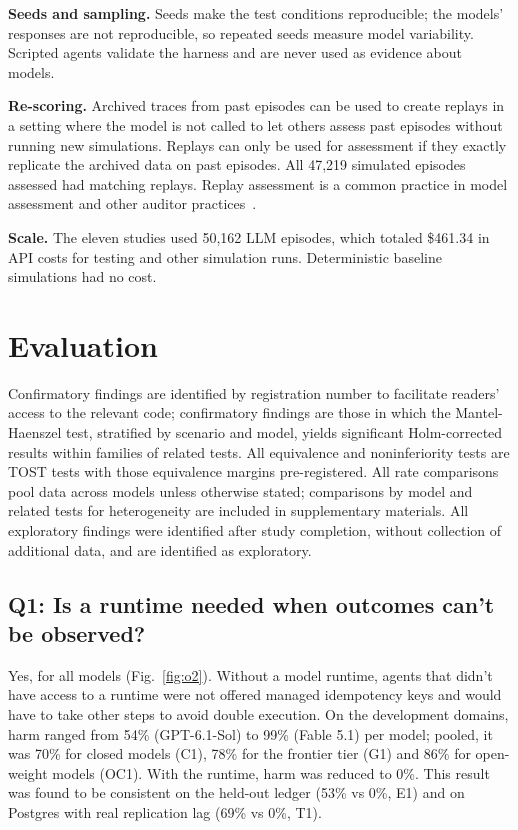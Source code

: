 \documentclass[letterpaper,twocolumn,10pt]{article}
\begin{document}
\textbf{Seeds and sampling.} Seeds make the test conditions reproducible; the models' responses are not reproducible, so repeated seeds measure model variability. Scripted agents validate the harness and are never used as evidence about models.

\textbf{Re-scoring.} Archived traces from past episodes can be used to create replays in a setting where the model is not called to let others assess past episodes without running new simulations. Replays can only be used for assessment if they exactly replicate the archived data on past episodes. All 47,219 simulated episodes assessed had matching replays. Replay assessment is a common practice in model assessment and other auditor practices~\cite{anthropic2026evals,openai2026coding}.

\textbf{Scale.} The eleven studies used 50,162 LLM episodes, which totaled \$461.34 in API costs for testing and other simulation runs. Deterministic baseline simulations had no cost.

\section{Evaluation}\label{sec:7}

Confirmatory findings are identified by registration number to facilitate readers' access to the relevant code; confirmatory findings are those in which the Mantel-Haenszel test, stratified by scenario and model, yields significant Holm-corrected results within families of related tests. All equivalence and noninferiority tests are TOST tests with those equivalence margins pre-registered. All rate comparisons pool data across models unless otherwise stated; comparisons by model and related tests for heterogeneity are included in supplementary materials. All exploratory findings were identified after study completion, without collection of additional data, and are identified as exploratory.

\subsection{Q1: Is a runtime needed when outcomes can't be observed?}\label{sec:7.1}

Yes, for all models (Fig.~\ref{fig:o2}). Without a model runtime, agents that didn't have access to a runtime were not offered managed idempotency keys and would have to take other steps to avoid double execution. On the development domains, harm ranged from 54\% (GPT-6.1-Sol) to 99\% (Fable 5.1) per model; pooled, it was 70\% for closed models (C1), 78\% for the frontier tier (G1) and 86\% for open-weight models (OC1). With the runtime, harm was reduced to 0\%. This result was found to be consistent on the held-out ledger (53\% vs 0\%, E1) and on Postgres with real replication lag (69\% vs 0\%, T1).
\end{document}
